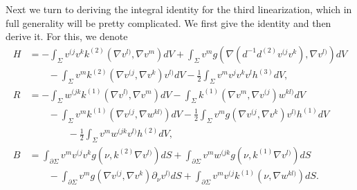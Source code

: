\documentclass[12pt]{amsart}
\def\p{\partial}
\theoremstyle{definition}
\theoremstyle{remark}
\begin{document}
Next we turn to deriving the integral identity for the third linearization, which in full generality will be pretty complicated. We first give the identity and then derive it. For this, we denote
\begin{equation}\label{eq:HRB}
 \begin{split}
 H&=-\int_{\Sigma}v^{(j}v^{k} k^{(2)}(\nabla v^{l)},\nabla v^m) dV +\int_{\Sigma}v^m g(\nabla (d^{-1}d^{(2)}v^{(j}v^k),\nabla v^{l)})dV \\
 &\qquad-\int_\Sigma v^m k^{(2)}(\nabla v^{(j},\nabla v^{k})v^{l)}dV-\frac{1}{2}\int_\Sigma v^mv^{j}v^{k}v^{l}h^{(3)}dV,\\
 R&=-\int_{\Sigma}w^{(jk}k^{(1)}(\nabla v^{l)},\nabla v^m)dV-\int_\Sigma k^{(1)}(\nabla v^m,\nabla v^{(j})w^{kl)}dV \\
 &\qquad-\int_{\Sigma}v^mk^{(1)}(\nabla v^{(j},\nabla w^{kl)})dV-\frac{1}{2}\int_\Sigma v^mg(\nabla v^{(j},\nabla v^{k})v^{l)}h^{(1)}dV  \\
 &\qquad \qquad -\frac{1}{2}\int_\Sigma v^mw^{(jk}v^{l)}h^{(2)}dV,   \\
 B&=\int_{\p \Sigma} v^mv^{(j}v^k g(\nu,k^{(2)}\nabla v^{l)})dS+\int_{\p \Sigma} v^mw^{(jk} g(\nu,k^{(1)}\nabla v^{l)})dS\\
&\qquad-\int_{\p \Sigma} v^mg(\nabla v^{(j},\nabla v^k)\p_\nu v^{l)}dS+\int_{\p \Sigma} v^mv^{(j} k^{(1)}(\nu,\nabla w^{kl)})dS.
\end{split}
\end{equation}
\end{document}
